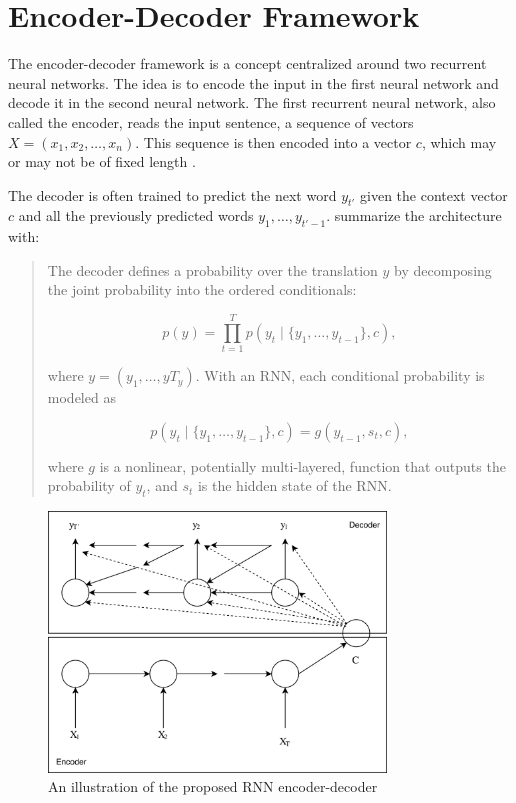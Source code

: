 
\section{Encoder-Decoder Framework}
\label{sec:encoder-decoder}
The encoder-decoder framework is a concept centralized around two recurrent neural networks. The idea is to encode the input in the first neural network and decode it in the second neural network. The first recurrent neural network, also called the encoder, reads the input sentence, a sequence of vectors \(X = (x_{1}, x_{2}, \ldots, x_{n})\). This sequence is then encoded into a vector \(c\), which may or may not be of fixed length \citep{sutskever2014sequence, cho2014learning}. 

The decoder is often trained to predict the next word \(y_{t'}\) given the context vector \(c\) and all the previously predicted words \({y_1, \ldots, y_{t'-1}}\). \cite{bahdanau2014neural} summarize the architecture with:

\begin{quote}
    The decoder defines a probability over the translation \(y\) by decomposing the joint probability into the ordered conditionals:
    
    \begin{equation}
        p(y)=\prod_{t=1}^{T} p(y_t \mid \{y_1, \ldots, y_{t-1}\}, c),
    \end{equation}
    
    where \(y = (y_1, \ldots, yT_y)\). With an RNN, each conditional probability is modeled as
    
    \begin{equation}
        p(y_t \mid \{y_1, \ldots, y_{t-1} \}, c) = g(y_{t-1}, s_t, c),
    \end{equation}
    
    where \(g\) is a nonlinear, potentially multi-layered, function that outputs the probability of \(y_t\), and \(s_t\) is the hidden state of the RNN.
\end{quote}

\begin{figure}[ht]
    \centering
    \includegraphics[width=0.8\textwidth]{fig/background_theory/encoder-decoder.png}
    \caption{An illustration of the proposed RNN encoder-decoder}
    \label{fig:purposed-encoder-decoder}
\end{figure}

